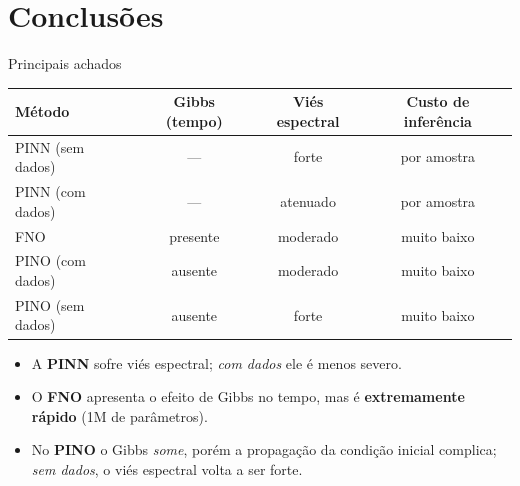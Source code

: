 \section{Conclusões}

\begin{frame}{Principais achados}
  \begin{table}
    \centering
    \small
    \begin{tabular}{@{}lccc@{}}
      \toprule
      \textbf{Método} & \textbf{Gibbs (tempo)} & \textbf{Viés espectral} & \textbf{Custo de inferência} \\
      \midrule
      PINN (sem dados)  & ---            & forte             & por amostra \\
      PINN (com dados)  & ---            & atenuado          & por amostra \\
      FNO               & \alert{presente} & moderado        & \alert{muito baixo} \\
      PINO (com dados)  & ausente        & moderado          & muito baixo \\
      PINO (sem dados)  & ausente        & \alert{forte}     & muito baixo \\
      \bottomrule
    \end{tabular}
  \end{table}
  \vspace{0.2cm}
  \begin{itemize}
    \item A \textbf{PINN} sofre viés espectral; \emph{com dados} ele é menos severo.
    \item O \textbf{FNO} apresenta o \alert{efeito de Gibbs} no tempo, mas é
          \textbf{extremamente rápido} (1M de parâmetros).
    \item No \textbf{PINO} o Gibbs \emph{some}, porém a propagação da condição inicial
          complica; \emph{sem dados}, o viés espectral volta a ser forte.
  \end{itemize}
\end{frame}

